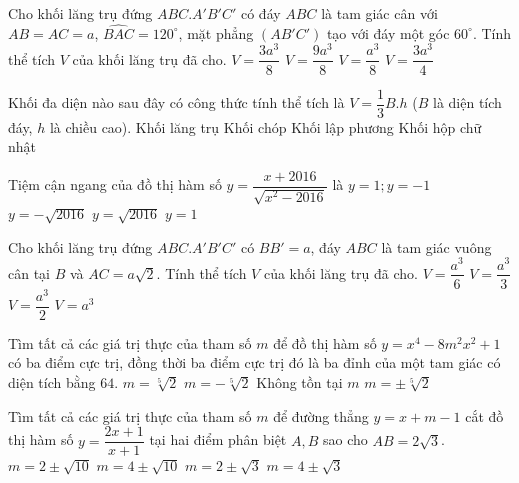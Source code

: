 \begin{ex}%
Cho khối lăng trụ đứng $ABC.A'B'C'$ có đáy $ABC$ là tam giác cân với $AB=AC=a$, $\widehat{BAC}=120^\circ$, mặt phẳng $(AB'C')$ tạo với đáy một góc $60^\circ$. Tính thể tích $V$ của khối lăng trụ đã cho.
\choice
{\True $V=\dfrac{3a^3}{8}$}
{$V=\dfrac{9a^3}{8}$}
{$V=\dfrac{a^3}{8}$}
{$V=\dfrac{3a^3}{4}$}
\end{ex}

\begin{ex}%
Khối đa diện nào sau đây có công thức tính thể tích là $V=\dfrac{1}{3}B.h$ ($B$ là diện tích đáy, $h$ là chiều cao).
\choice
{Khối lăng trụ}
{\True Khối chóp}
{Khối lập phương}
{Khối hộp chữ nhật}
\end{ex}

\begin{ex}%
Tiệm cận ngang của đồ thị hàm số $y=\dfrac{x+2016}{\sqrt{x^2-2016}}$ là
\choice
{\True $y=1; y=-1$}
{$y=-\sqrt{2016}$}
{$y=\sqrt{2016}$}
{$y=1$}
\end{ex}

\begin{ex}%
Cho khối lăng trụ đứng $ABC.A'B'C'$ có $BB'=a$, đáy $ABC$ là tam giác vuông cân tại $B$ và $AC=a\sqrt{2}$. Tính thể tích $V$ của khối lăng trụ đã cho.
\choice
{$V=\dfrac{a^3}{6}$}
{$V=\dfrac{a^3}{3}$}
{\True $V=\dfrac{a^3}{2}$}
{$V=a^3$}
\end{ex}

\begin{ex}%
Tìm tất cả các giá trị thực của tham số $m$ để đồ thị hàm số $y=x^4-8m^2x^2+1$ có ba điểm cực trị, đồng thời ba điểm cực trị đó là ba đỉnh của một tam giác có diện tích bằng $64$.
\choice
{$m=\sqrt[5]{2}$}
{$m=-\sqrt[5]{2}$}
{Không tồn tại $m$}
{\True $m=\pm\sqrt[5]{2}$}
\end{ex}



\begin{ex}%
Tìm tất cả các giá trị thực của tham số $m$ để đường thẳng $y=x+m-1$ cắt đồ thị hàm số $y=\dfrac{2x+1}{x+1}$ tại hai điểm phân biệt $A, B$ sao cho $AB=2\sqrt{3}$.
\choice
{$m=2\pm \sqrt{10}$}
{\True $m=4\pm\sqrt{10}$}
{$m=2\pm\sqrt{3}$}
{$m=4\pm\sqrt{3}$}
\end{ex}


